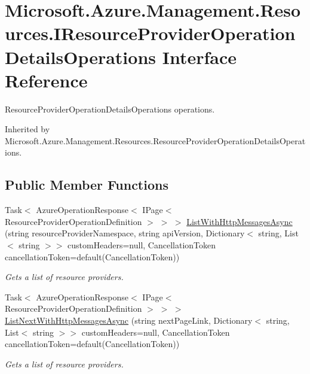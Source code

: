 \hypertarget{interface_microsoft_1_1_azure_1_1_management_1_1_resources_1_1_i_resource_provider_operation_details_operations}{}\section{Microsoft.\+Azure.\+Management.\+Resources.\+I\+Resource\+Provider\+Operation\+Details\+Operations Interface Reference}
\label{interface_microsoft_1_1_azure_1_1_management_1_1_resources_1_1_i_resource_provider_operation_details_operations}


Resource\+Provider\+Operation\+Details\+Operations operations.  




Inherited by Microsoft.\+Azure.\+Management.\+Resources.\+Resource\+Provider\+Operation\+Details\+Operations.

\subsection*{Public Member Functions}
\begin{DoxyCompactItemize}
\item 
Task$<$ Azure\+Operation\+Response$<$ I\+Page$<$ Resource\+Provider\+Operation\+Definition $>$ $>$ $>$ \hyperlink{interface_microsoft_1_1_azure_1_1_management_1_1_resources_1_1_i_resource_provider_operation_details_operations_aa96a381f62b0aa608a84a6b347167ee9}{List\+With\+Http\+Messages\+Async} (string resource\+Provider\+Namespace, string api\+Version, Dictionary$<$ string, List$<$ string $>$$>$ custom\+Headers=null, Cancellation\+Token cancellation\+Token=default(Cancellation\+Token))
\begin{DoxyCompactList}\small\item\em Gets a list of resource providers. \end{DoxyCompactList}\item 
Task$<$ Azure\+Operation\+Response$<$ I\+Page$<$ Resource\+Provider\+Operation\+Definition $>$ $>$ $>$ \hyperlink{interface_microsoft_1_1_azure_1_1_management_1_1_resources_1_1_i_resource_provider_operation_details_operations_aad57181801ce966de4020eea5cd96d27}{List\+Next\+With\+Http\+Messages\+Async} (string next\+Page\+Link, Dictionary$<$ string, List$<$ string $>$$>$ custom\+Headers=null, Cancellation\+Token cancellation\+Token=default(Cancellation\+Token))
\begin{DoxyCompactList}\small\item\em Gets a list of resource providers. \end{DoxyCompactList}\end{DoxyCompactItemize}


